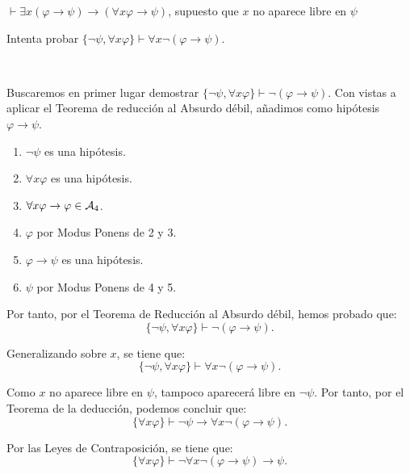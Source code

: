 \begin{ejercicio}\label{ej:2.9}
    $\vdash \exists x(\varphi \rightarrow \psi) \rightarrow (\forall x \varphi \rightarrow \psi)$, supuesto que $x$ no aparece libre en $\psi$
    \begin{observacion}
        Intenta probar $\{\neg \psi, \forall x \varphi\} \vdash \forall x \neg (\varphi \rightarrow \psi)$.
    \end{observacion}~

    Buscaremos en primer lugar demostrar $\{\neg \psi, \forall x \varphi\} \vdash \neg (\varphi \rightarrow \psi)$. Con vistas a aplicar el Teorema de reducción al Absurdo débil, añadimos como hipótesis $\varphi \rightarrow \psi$.
    \begin{enumerate}
        \item $\neg \psi$ es una hipótesis.
        \item $\forall x \varphi$ es una hipótesis.
        \item $\forall x \varphi \rightarrow \varphi\in \mathcal{A}_4$.
        \item $\varphi$ por Modus Ponens de 2 y 3.
        \item $\varphi \rightarrow \psi$ es una hipótesis.
        \item $\psi$ por Modus Ponens de 4 y 5.
    \end{enumerate}

    Por tanto, por el Teorema de Reducción al Absurdo débil, hemos probado que:
    \begin{equation*}
        \{\neg \psi, \forall x \varphi\} \vdash \neg (\varphi \rightarrow \psi).
    \end{equation*}

    Generalizando sobre $x$, se tiene que:
    \begin{equation*}
        \{\neg \psi, \forall x \varphi\} \vdash \forall x \neg (\varphi \rightarrow \psi).
    \end{equation*}

    Como $x$ no aparece libre en $\psi$, tampoco aparecerá libre en $\neg\psi$. Por tanto, por el Teorema de la deducción, podemos concluir que:
    \begin{equation*}
        \{\forall x\varphi\} \vdash \neg\psi\rightarrow \forall x \neg (\varphi \rightarrow \psi).
    \end{equation*}

    Por las Leyes de Contraposición, se tiene que:
    \begin{equation*}
        \{\forall x\varphi\} \vdash \neg\forall x \neg (\varphi \rightarrow \psi) \rightarrow \psi.
    \end{equation*}


\end{ejercicio}
